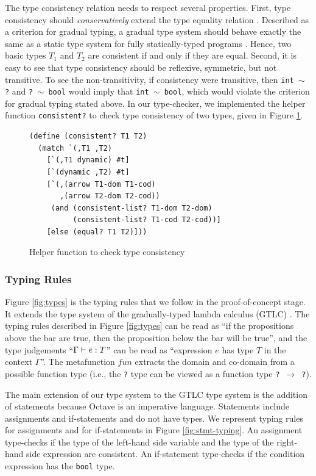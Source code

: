 The type consistency relation needs to respect several properties. First, type consistency should \emph{conservatively} extend the type equality relation \cite{garcia2016abstracting}. Described as a criterion for gradual typing, a gradual type system should behave exactly the same as a static type system for fully statically-typed programs \cite{siek2015refined}. Hence, two basic types $T_1$ and $T_2$ are consistent if and only if they are equal. Second, it is easy to see that type consistency should be reflexive, symmetric, but not transitive. To see the non-transitivity, if consistency were transitive, then {\tt int $\sim$ ?} and {\tt ? $\sim$ bool} would imply that {\tt int $\sim$ bool}, which would violate the criterion for gradual typing stated above. In our type-checker, we implemented the helper function {\tt consistent?} to check type consistency of two types, given in Figure \ref{fig:consistent}.

\begin{figure}[h]
    \begin{lstlisting}[language=racket]
(define (consistent? T1 T2)
  (match `(,T1 ,T2)
    [`(,T1 dynamic) #t]
    [`(dynamic ,T2) #t]
    [`(,(arrow T1-dom T1-cod)
       ,(arrow T2-dom T2-cod))
     (and (consistent-list? T1-dom T2-dom)
          (consistent-list? T1-cod T2-cod))]
    [else (equal? T1 T2)]))
    \end{lstlisting}
    \caption[]{Helper function to check type consistency}
    \label{fig:consistent}
\end{figure}

\subsubsection{Typing Rules}
Figure \ref{fig:types} is the typing rules that we follow in the proof-of-concept stage. It extends the type system of the gradually-typed lambda calculus (GTLC) \cite{siek2006gradual}. The typing rules described in Figure \ref{fig:types} can be read as ``if the propositions above the bar are true, then the proposition below the bar will be true'', and the type judgements ``${\Gamma} \vdash {e} : {T}$'' can be read as ``expression $e$ has type $T$ in the context $\Gamma$''. The metafunction $fun$ extracts the domain and co-domain from a possible function type (i.e., the {\tt ?} type can be viewed as a function type {\tt ? $\to$ ?}).

The main extension of our type system to the GTLC type system is the addition of statements because Octave is an imperative language. Statements include assignments and if-statements and do not have types. We represent typing rules for assignments and for if-statements in Figure \ref{fig:stmt-typing}. An assignment type-checks if the type of the left-hand side variable and the type of the right-hand side expression are consistent. An if-statement type-checks if the condition expression has the {\tt bool} type.

